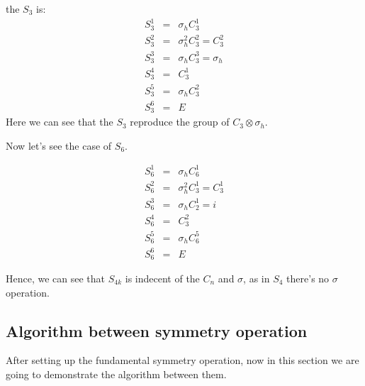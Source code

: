 the $S_{3}$ is:
\begin{eqnarray}\label{GROUPeq:3}
  S^{1}_{3} &=& \sigma_{h}C^{1}_{3}                 \nonumber \\
  S^{2}_{3} &=& \sigma^{2}_{h}C^{2}_{3} = C^{2}_{3} \nonumber \\
  S^{3}_{3} &=& \sigma_{h}C^{3}_{3} = \sigma_{h}    \nonumber \\
  S^{4}_{3} &=& C^{1}_{3}                           \nonumber \\
  S^{5}_{3} &=& \sigma_{h}C^{2}_{3}                 \nonumber \\
  S^{6}_{3} &=& E
\end{eqnarray}
Here we can see that the $S_{3}$ reproduce the group of $C_{3}\otimes
\sigma_{h}$.


Now let's see the case of $S_{6}$.

\begin{eqnarray}\label{GROUPeq:4}
  S^{1}_{6} &=& \sigma_{h}C^{1}_{6}                 \nonumber \\
  S^{2}_{6} &=& \sigma^{2}_{h}C^{1}_{3} = C^{1}_{3} \nonumber \\
  S^{3}_{6} &=& \sigma_{h}C^{1}_{2} = i             \nonumber \\
  S^{4}_{6} &=& C^{2}_{3}                           \nonumber \\
  S^{5}_{6} &=& \sigma_{h}C^{5}_{6}                 \nonumber \\
  S^{6}_{6} &=& E
\end{eqnarray}

Hence, we can see that $S_{4k}$ is indecent of the $C_{n}$ and
$\sigma$, as in $S_{4}$ there's no $\sigma$ operation.

\subsection{Algorithm between symmetry operation}
%
%
%
After setting up the fundamental symmetry operation, now in this
section we are going to demonstrate the algorithm between them.

